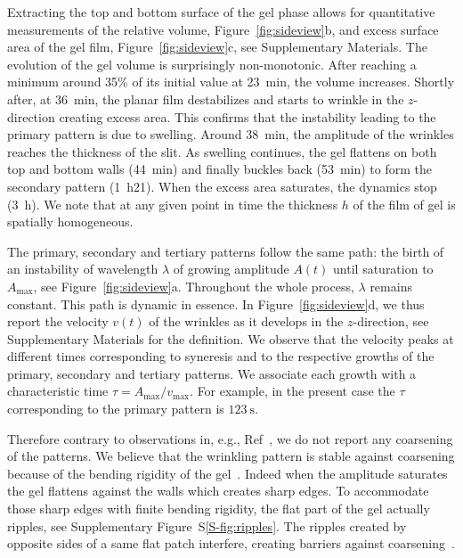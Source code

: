 \documentclass[twocolumn,superscriptaddress,showpacs,preprintnumbers, amsmath,amssymb,prl]{revtex4-1}
\begin{document}
Extracting the top and bottom surface of the gel phase allows for quantitative measurements of the relative volume, Figure~\ref{fig:sideview}b, and excess surface area of the gel film, Figure~\ref{fig:sideview}c, see Supplementary Materials. The evolution of the gel volume is surprisingly non-monotonic. After reaching a minimum around 35\% of its initial value at \SI{23}{\minute}, the volume increases. Shortly after, at \SI{36}{\minute}, the planar film destabilizes and starts to wrinkle in the $z$-direction creating excess area. This confirms that the instability leading to the primary pattern is due to swelling. Around \SI{38}{\minute}, the amplitude of the wrinkles reaches the thickness of the slit. As swelling continues, the gel flattens on both top and bottom walls (\SI{44}{\minute}) and finally buckles back (\SI{53}{\minute}) to form the secondary pattern (\SI{1}{\hour}21). When the excess area saturates, the dynamics stop (\SI{3}{\hour}). We note that at any given point in time the thickness $h$ of the film of gel is spatially homogeneous.

The primary, secondary and tertiary patterns follow the same path: the birth of an instability of wavelength $\lambda$ of growing amplitude $A(t)$ until saturation to $A_\text{max}$, see Figure~\ref{fig:sideview}a. Throughout the whole process, $\lambda$ remains constant. This path is dynamic in essence. In Figure~\ref{fig:sideview}d, we thus report the velocity $v(t)$ of the wrinkles as it develops in the $z$-direction, see Supplementary Materials for the definition. We observe that the velocity peaks at different times corresponding to syneresis and to the respective growths of the primary, secondary and tertiary patterns. We associate each growth with a characteristic time $\tau = A_\text{max}/v_\text{max}$. For example, in the present case the $\tau$ corresponding to the primary pattern is $\SI{123}{\second}$.

Therefore contrary to observations in, e.g., Ref~\cite{Yoo2003}, we do not report any coarsening of the patterns. We believe that the wrinkling pattern is stable against coarsening because of the bending rigidity of the gel~\cite{LeGoff2014}. Indeed when the amplitude saturates the gel flattens against the walls which creates sharp edges. To accommodate those sharp edges with finite bending rigidity, the flat part of the gel actually ripples, see Supplementary Figure~S\ref{S-fig:ripples}. The ripples created by opposite sides of a same flat patch interfere, creating barriers against coarsening~\cite{LeGoff2014}.
\end{document}
